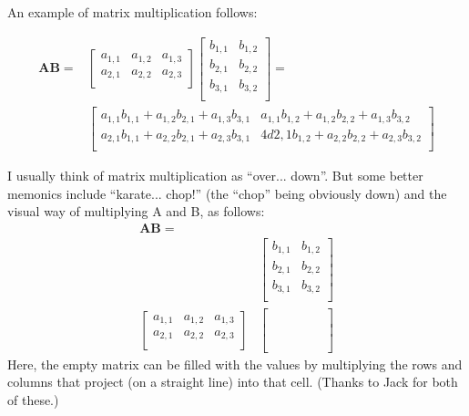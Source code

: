 \documentclass[a4paper,10pt]{scrartcl}
\begin{document}
An example of matrix multiplication follows:

\begin{align}
 \mathbf{A} \mathbf{B} = &
 \begin{bmatrix}
  a_{1,1} & a_{1,2} & a_{1,3} \\
  a_{2,1} & a_{2,2} & a_{2,3} \\
 \end{bmatrix}
 \begin{bmatrix}
  b_{1,1} & b_{1,2} \\
  b_{2,1} & b_{2,2} \\
  b_{3,1} & b_{3,2} \\
 \end{bmatrix}
 = \\
 &
 \begin{bmatrix}
  a_{1,1} b_{1,1} + a_{1,2} b_{2,1} + a_{1,3} b_{3,1} & a_{1,1} b_{1,2} + a_{1,2} b_{2,2} + a_{1,3} b_{3,2} \\
  a_{2,1} b_{1,1} + a_{2,2} b_{2,1} + a_{2,3} b_{3,1} & 4d {2,1} b_{1,2} + a_{2,2} b_{2,2} + a_{2,3} b_{3,2} \\
 \end{bmatrix}
\end{align}

I usually think of matrix multiplication as ``over... down''. But some better memonics include ``karate... chop!'' (the ``chop'' being obviously down) and the visual way of multiplying A and B, as follows:
\begin{align}
 \mathbf{A} \mathbf{B} = &\\
 &
 \begin{bmatrix}
  b_{1,1} & b_{1,2} \\
  b_{2,1} & b_{2,2} \\
  b_{3,1} & b_{3,2} \\
 \end{bmatrix}
 \\
 \begin{bmatrix}
  a_{1,1} & a_{1,2} & a_{1,3} \\
  a_{2,1} & a_{2,2} & a_{2,3} \\
 \end{bmatrix}
 &
 \begin{bmatrix}
  \phantom{b_{3,1}} & \phantom{b_{1,3}} \\
  \phantom{b_{3,2}} & \phantom{b_{3,2}} \\
 \end{bmatrix}
\end{align}
Here, the empty matrix can be filled with the values by multiplying the rows and columns that project (on a straight line) into that cell. (Thanks to Jack for both of these.)
\end{document}
